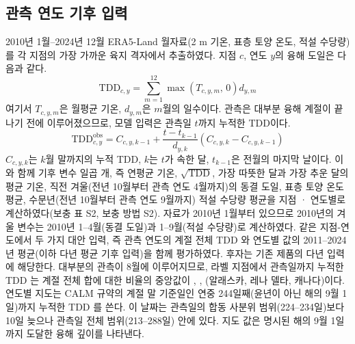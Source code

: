 
\subsection{관측 연도 기후 입력}
2010년 1월--2024년 12월 ERA5-Land 월자료\cite{munozsabater2021_era5_land}(2 m 기온, 표층 토양 온도, 적설 수당량)를 각 지점의 가장 가까운 육지 격자에서 추출하였다. 지점 $c$, 연도 $y$의 융해 도일\cite{Nelson1997,Riseborough2008}은 다음과 같다.
\begin{equation}
\mathrm{TDD}_{c,y} = \sum_{m=1}^{12} \max\!\left(T_{c,y,m},\,0\right) d_{y,m}
\label{eq:tdd}
\end{equation}
여기서 $T_{c,y,m}$은 월평균 기온, $d_{y,m}$은 $m$월의 일수이다. 관측은 대부분 융해 계절이 끝나기 전에 이루어졌으므로, 모델 입력은 관측일 $t$까지 누적한 TDD이다.
\begin{equation}
\mathrm{TDD}^{\mathrm{obs}}_{c,y} = C_{c,y,k-1} + \frac{t - t_{k-1}}{d_{y,k}} \left( C_{c,y,k} - C_{c,y,k-1} \right)
\label{eq:tddobs}
\end{equation}
$C_{c,y,k}$는 $k$월 말까지의 누적 TDD, $k$는 $t$가 속한 달, $t_{k-1}$은 전월의 마지막 날이다. 이와 함께 기후 변수 일곱 개, 즉 연평균 기온, $\sqrt{\mathrm{TDD}}$, 가장 따뜻한 달과 가장 추운 달의 평균 기온, 직전 겨울(전년 10월부터 관측 연도 4월까지)의 동결 도일, 표층 토양 온도 평균, 수문년(전년 10월부터 관측 연도 9월까지) 적설 수당량 평균을 지점 · 연도별로 계산하였다(보충 표 S2, 보충 방법 S2). 자료가 2010년 1월부터 있으므로 2010년의 겨울 변수는 2010년 1--4월(동결 도일)과 1--9월(적설 수당량)로 계산하였다. 같은 지점-연도에서 두 가지 대안 입력, 즉 관측 연도의 계절 전체 TDD 와 연도별 값의 2011--2024년 평균(이하 다년 평균 기후 입력)을 함께 평가하였다. 후자는 기존 제품의 다년 입력에 해당한다. 대부분의 관측이 8월에 이루어지므로, 라벨 지점에서 관측일까지 누적한 TDD 는 계절 전체 합에 대한 비율의 중앙값이 \ntddfracAk, \ntddfracLe, \ntddfracCa(알래스카, 레나 델타, 캐나다)이다. 연도별 지도는 CALM 규약의 계절 말 기준일인 연중 244일째(윤년이 아닌 해의 9월 1일)까지 누적한 TDD 를 쓴다. 이 날짜는 관측일의 합동 사분위 범위(224--234일)보다 10일 늦으나 관측일 전체 범위(213--288일) 안에 있다. 지도 값은 명시된 해의 9월 1일까지 도달한 융해 깊이를 나타낸다.

